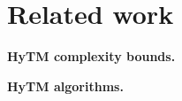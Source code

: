 \section{Related work}
\label{sec:related}
%
\vspace{1mm}\noindent\textbf{HyTM complexity bounds.}

\vspace{1mm}\noindent\textbf{HyTM algorithms.} 